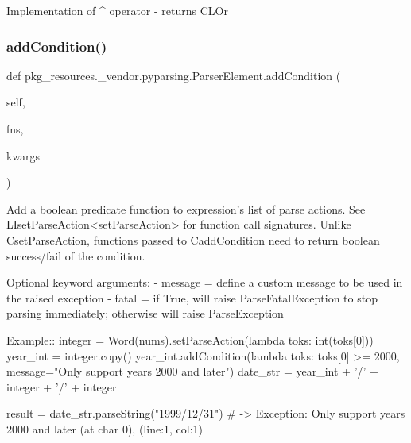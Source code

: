 \begin{DoxyVerb}Implementation of ^ operator - returns C{L{Or}}
\end{DoxyVerb}
 \mbox{\label{classpkg__resources_1_1__vendor_1_1pyparsing_1_1ParserElement_aa60387fa923bdb94d8eb4f0e69261963}} 
\subsubsection{\texorpdfstring{add\+Condition()}{addCondition()}}
{\footnotesize\ttfamily def pkg\+\_\+resources.\+\_\+vendor.\+pyparsing.\+Parser\+Element.\+add\+Condition (\begin{DoxyParamCaption}\item[{}]{self,  }\item[{}]{fns,  }\item[{}]{kwargs }\end{DoxyParamCaption})}

\begin{DoxyVerb}Add a boolean predicate function to expression's list of parse actions. See 
L{I{setParseAction}<setParseAction>} for function call signatures. Unlike C{setParseAction}, 
functions passed to C{addCondition} need to return boolean success/fail of the condition.

Optional keyword arguments:
 - message = define a custom message to be used in the raised exception
 - fatal   = if True, will raise ParseFatalException to stop parsing immediately; otherwise will raise ParseException
 
Example::
    integer = Word(nums).setParseAction(lambda toks: int(toks[0]))
    year_int = integer.copy()
    year_int.addCondition(lambda toks: toks[0] >= 2000, message="Only support years 2000 and later")
    date_str = year_int + '/' + integer + '/' + integer

    result = date_str.parseString("1999/12/31")  # -> Exception: Only support years 2000 and later (at char 0), (line:1, col:1)
\end{DoxyVerb}
 \mbox{\label{classpkg__resources_1_1__vendor_1_1pyparsing_1_1ParserElement_a21d9aab48590eca6709948628a4df8cd}} 
